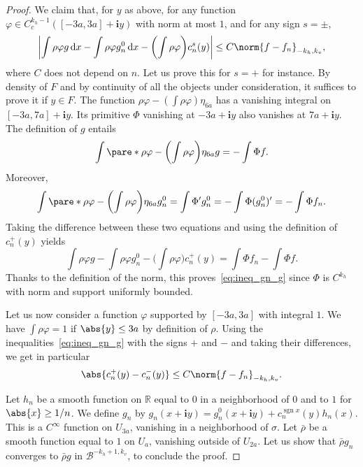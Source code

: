 \documentclass[10pt]{amsart}
\newcommand{\boB}{\mathcal{B}}
\newcommand{\R}{\mathbb{R}}
\newcommand{\dd}{\mathop{}\!\mathrm{d}}
\newcommand{\ic}{\mathbf{i}}
\newcommand{\paregg}[1]{\biggl(#1\biggr)}
\newcommand{\absgg}[1]{\biggl \lvert#1\biggr\rvert}
\DeclareMathOperator{\sgn}{sgn}
\let\phi\varphi
\theoremstyle{definition}
\numberwithin{equation}{section}
\begin{document}
\begin{proof}
We claim that, for $y$ as above, for any function $\phi \in C^{k_h-1}_c([-3a,
3a] + \ic y)$ with norm at most $1$, and for any sign $s = \pm$,
\begin{equation}
\label{eq:ineq_gn_g}
\absgg{\int \rho \phi g \dd x - \int \rho \phi g^0_n \dd x - \paregg{\int \rho \phi} c^s_n(y)}
\leq C \norm{f-f_n}_{-k_h, k_v},
\end{equation}
where $C$ does not depend on $n$. Let us prove this for $s=+$ for instance.
By density of $F$ and by continuity of all the objects under consideration,
it suffices to prove it if $y\in F$. The function $\rho \phi -(\int \rho
\phi) \eta_{6a}$ has a vanishing integral on $[-3a, 7a] + \ic y$. Its
primitive $\Phi$ vanishing at $-3a + \ic y$ also vanishes at $7a + \ic y$.
The definition of $g$ entails
\begin{equation*}
\int \pare*{\rho \phi - \paregg{\int \rho \phi} \eta_{6a}} g = - \int \Phi f.
\end{equation*}
Moreover,
\begin{equation*}
\int \pare*{\rho \phi - \paregg{\int \rho \phi} \eta_{6a}} g^0_n = \int \Phi' g^0_n = - \int \Phi (g^0_n)' = -\int \Phi f_n.
\end{equation*}
Taking the difference between these two equations and using the definition of
$c_n^+(y)$ yields
\begin{equation*}
\int \rho \phi g - \int \rho \phi g^0_n - \paregg{\int \rho \phi} c_n^+(y) = \int \Phi f_n - \int \Phi f.
\end{equation*}
Thanks to the definition of the norm, this proves~\eqref{eq:ineq_gn_g} since
$\Phi$ is $C^{k_h}$ with norm and support uniformly bounded.

Let us now consider a function $\phi$ supported by $[-3a,3a]$ with integral
$1$. We have $\int \rho \phi = 1$ if $\abs{y} \leq 3a$ by definition of
$\rho$. Using the inequalities~\eqref{eq:ineq_gn_g} with the signs $+$ and
$-$ and taking their differences, we get in particular
\begin{equation}
\label{eq:cn_pm_diff}
\abs{c^+_n(y) - c^-_n(y)} \leq C \norm{f-f_n}_{-k_h, k_v}.
\end{equation}

Let $h_n$ be a smooth function on $\R$ equal to $0$ in a neighborhood of $0$
and to $1$ for $\abs{x} \geq 1/n$. We define $g_n$ by $g_n(x + \ic y) =
g_n^0(x+\ic y) + c_n^{\sgn x}(y) h_n(x)$. This is a $C^\infty$ function on
$U_{3a}$, vanishing in a neighborhood of $\sigma$. Let $\bar\rho$ be a smooth
function equal to $1$ on $U_a$, vanishing outside of $U_{2a}$. Let us show
that $\bar\rho g_n$ converges to $\bar\rho g$ in $\boB^{-k_h+1, k_v}$, to
conclude the proof.


\end{proof}
\end{document}
